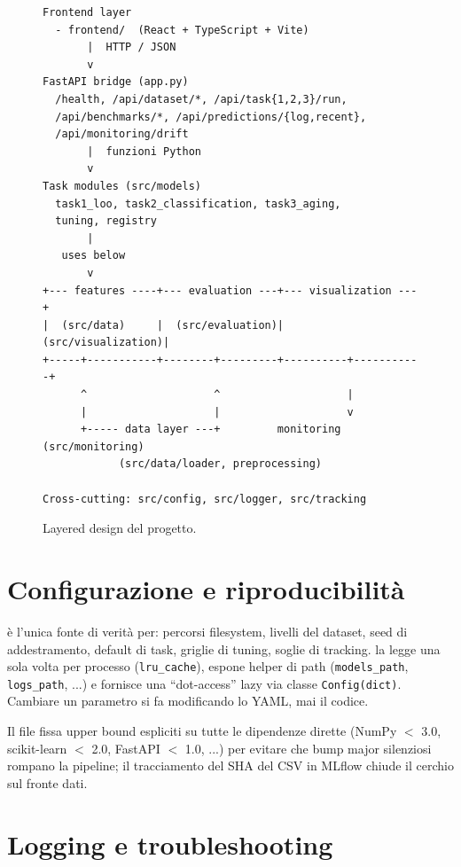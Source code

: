 \begin{figure}[H]
  \centering
  \begin{tcolorbox}[colback=white, colframe=accent, boxrule=0.4pt,
                    arc=2mm, left=4mm, right=4mm, top=2mm, bottom=2mm]
\begin{verbatim}
Frontend layer
  - frontend/  (React + TypeScript + Vite)
       |  HTTP / JSON
       v
FastAPI bridge (app.py)
  /health, /api/dataset/*, /api/task{1,2,3}/run,
  /api/benchmarks/*, /api/predictions/{log,recent},
  /api/monitoring/drift
       |  funzioni Python
       v
Task modules (src/models)
  task1_loo, task2_classification, task3_aging,
  tuning, registry
       |
   uses below
       v
+--- features ----+--- evaluation ---+--- visualization ---+
|  (src/data)     |  (src/evaluation)|  (src/visualization)|
+-----+-----------+--------+---------+----------+-----------+
      ^                    ^                    |
      |                    |                    v
      +----- data layer ---+         monitoring (src/monitoring)
            (src/data/loader, preprocessing)

Cross-cutting: src/config, src/logger, src/tracking
\end{verbatim}
  \end{tcolorbox}
  \caption{Layered design del progetto.}
  \label{fig:arch}
\end{figure}

\section{Configurazione e riproducibilità}

 è l'unica fonte di verità per: percorsi
filesystem, livelli del dataset, seed di addestramento, default di task,
griglie di tuning, soglie di tracking.  la legge
una sola volta per processo (\texttt{lru\_cache}), espone helper di path
(\texttt{models\_path}, \texttt{logs\_path}, ...) e fornisce una
``dot-access'' lazy via classe \texttt{Config(dict)}. Cambiare un parametro
si fa modificando lo YAML, mai il codice.

Il file  fissa upper bound espliciti su tutte le
dipendenze dirette (NumPy $<$ 3.0, scikit-learn $<$ 2.0, FastAPI $<$ 1.0,
...) per evitare che bump major silenziosi rompano la pipeline; il
tracciamento del SHA del CSV in MLflow chiude il cerchio sul fronte dati.

\section{Logging e troubleshooting}

